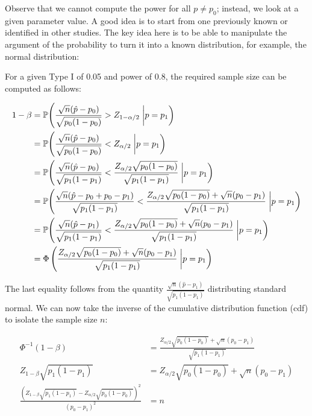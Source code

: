 \documentclass[]{book}
\begin{document}
Observe that we cannot compute the power for all \(p\neq p_0\); instead, we look at a given parameter value. A good idea is to start from one previously known or identified in other studies. The key idea here is to be able to manipulate the argument of the probability to turn it into a known distribution, for example, the normal distribution:

For a given Type I of 0.05 and power of 0.8, the required sample size can be computed as follows:

\begin{align*}
1 - \beta & = \mathbb{P}{\left(\frac{\sqrt{n}(\hat p - p_0)}{\sqrt{p_0(1-p_0)}} > Z_{1-\alpha/2}\right.\left|\vphantom{\frac{1}{2}}p = p_1\right)} \\
& = \mathbb{P}{\left(\frac{\sqrt{n}(\hat p - p_0)}{\sqrt{p_0(1-p_0)}} < Z_{\alpha/2}\right.\left|\vphantom{\frac{1}{2}}p = p_1\right)} \\
& = \mathbb{P}{\left(\frac{\sqrt{n}(\hat p - p_0)}{\sqrt{p_1(1-p_1)}} < \frac{Z_{\alpha/2}\sqrt{p_0(1-p_0)}}{\sqrt{p_1(1-p_1)}}\right.\left|\vphantom{\frac{1}{2}}p = p_1\right)} \\
& = \mathbb{P}{\left(\frac{\sqrt{n}(\hat p - p_0 + p_0 - p_1)}{\sqrt{p_1(1-p_1)}} < \frac{Z_{\alpha/2}\sqrt{p_0(1-p_0)} + \sqrt{n}(p_0 - p_1)}{\sqrt{p_1(1-p_1)}}\right.\left|\vphantom{\frac{1}{2}}p = p_1\right)} \\
& = \mathbb{P}{\left(\frac{\sqrt{n}(\hat p - p_1)}{\sqrt{p_1(1-p_1)}} < \frac{Z_{\alpha/2}\sqrt{p_0(1-p_0)} + \sqrt{n}(p_0 - p_1)}{\sqrt{p_1(1-p_1)}}\right.\left|\vphantom{\frac{1}{2}}p = p_1\right)} \\
& = \Phi\left(\frac{Z_{\alpha/2}\sqrt{p_0(1-p_0)} + \sqrt{n}(p_0 - p_1)}{\sqrt{p_1(1-p_1)}}\right.\left|\vphantom{\frac{1}{2}}p = p_1\right) \\
\end{align*}

The last equality follows from the quantity \(\frac{\sqrt{n}(\hat p - p_1)}{\sqrt{p_1(1-p_1)}}\) distributing standard normal. We can now take the inverse of the cumulative distribution function (cdf) to isolate the sample size \(n\):

\begin{align*}
\Phi^{-1}(1 - \beta)& = \frac{Z_{\alpha/2}\sqrt{p_0(1-p_0)} + \sqrt{n}(p_0 - p_1)}{\sqrt{p_1(1-p_1)}} \\
Z_{1-\beta}\sqrt{p_1(1-p_1)}& = Z_{\alpha/2}\sqrt{p_0(1-p_0)} + \sqrt{n}(p_0 - p_1) \\
\frac{\left(Z_{1-\beta}\sqrt{p_1(1-p_1)} - Z_{\alpha/2}\sqrt{p_0(1-p_0)}\right)^2}{(p_0 - p_1)^2}& = n \\
\end{align*}
\end{document}
